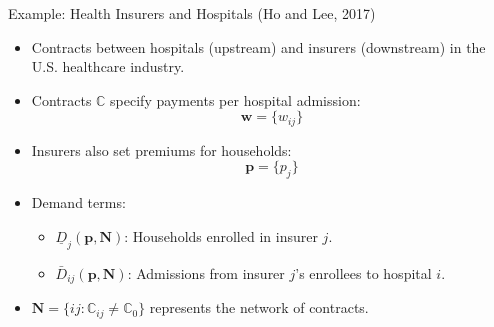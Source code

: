 \documentclass[aspectratio=169]{beamer}  %
\begin{document}
\begin{frame}{Example:  Health Insurers and Hospitals (Ho and Lee, 2017)}
    \begin{itemize}
        \item Contracts between hospitals (upstream) and insurers (downstream) in the U.S. healthcare industry.
        \item Contracts \(\mathbb{C}\) specify payments per hospital admission:
        \[
        \boldsymbol{w} = \{w_{ij}\}
        \]
        \item Insurers also set premiums for households:
        \[
        \boldsymbol{p} = \{p_j\}
        \]
        \item Demand terms:
        \begin{itemize}
            \item \(\underline{D}_j(\boldsymbol{p}, \boldsymbol{N})\): Households enrolled in insurer \(j\).
            \item \(\bar{D}_{ij}(\boldsymbol{p}, \boldsymbol{N})\): Admissions from insurer \(j\)'s enrollees to hospital \(i\).
        \end{itemize}
        \item \(\boldsymbol{N} = \{ij : \mathbb{C}_{ij} \neq \mathbb{C}_0\}\) represents the network of contracts.
    \end{itemize}
\end{frame}
\end{document}
